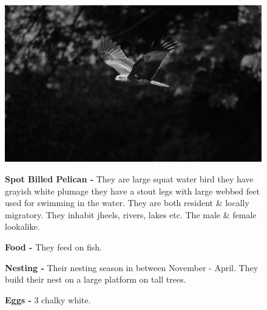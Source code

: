 \begin{figure}[H]
\begin{center}
\includegraphics{figure/Land_birds/01_pariah_kite/pariah-kite.eps}
\end{center}
\medskip
\noindent
{\bf Spot Billed Pelican -} They are large squat water bird they have grayish white plumage they have a stout legs with large webbed feet used for swimming in the water. They are both resident \& locally migratory. They inhabit jheels, rivers, lakes etc. The male \& female lookalike. 

\medskip
{\bf Food -} They feed on fish.

{\bf Nesting -} Their nesting season in between November - April. They build their nest on a large platform on tall trees.

{\bf Eggs -} 3 chalky white.
\end{figure}

\vfill\eject

~\phantom{a}
\vfill

